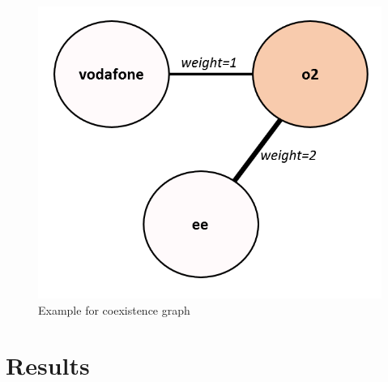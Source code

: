 \documentclass[sigconf]{acmart}
\begin{document}
{\begin{figure}[htb]
\centering
\includegraphics[width=\columnwidth]{images/coexistencegraph2.png}
\caption{Example for coexistence graph}
\label{fig:coexistencegraph2}
\end{figure}

\section{Results}\label{results}




}
\end{document}

